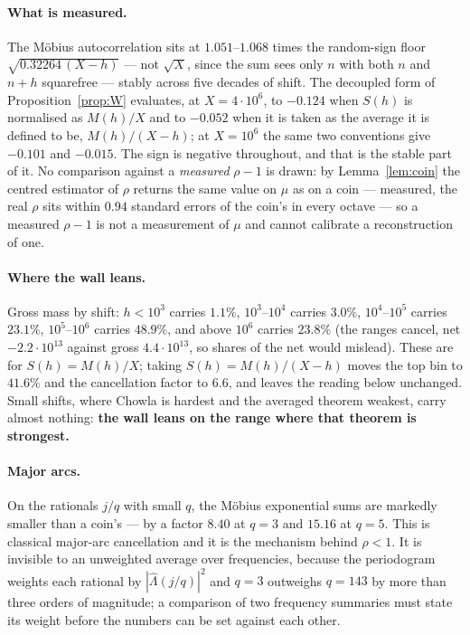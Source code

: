 \documentclass[11pt,a4paper]{article}
\theoremstyle{plain}
\theoremstyle{definition}
\begin{document}
\paragraph{What is measured.} The M\"obius autocorrelation sits at
$1.051$--$1.068$ times the random-sign floor $\sqrt{0.32264\,(X-h)}$
--- not $\sqrt X$, since the sum sees only $n$ with both $n$ and $n+h$
squarefree --- stably across five decades of shift. The decoupled form
of Proposition~\ref{prop:W} evaluates, at $X = 4\cdot10^6$, to
$-0.124$ when $S(h)$ is normalised as $M(h)/X$ and to $-0.052$ when it
is taken as the average it is defined to be, $M(h)/(X-h)$; at
$X = 10^6$ the same two conventions give $-0.101$ and $-0.015$. The
sign is negative throughout, and that is the stable part of it. No
comparison against a \emph{measured} $\rho-1$ is drawn: by
Lemma~\ref{lem:coin} the centred estimator of $\rho$ returns the same
value on $\mu$ as on a coin --- measured, the real $\rho$ sits within
$0.94$ standard errors of the coin's in every octave --- so a measured
$\rho-1$ is not a measurement of $\mu$ and cannot calibrate a
reconstruction of one.

\paragraph{Where the wall leans.} Gross mass by shift:
$h<10^3$ carries $1.1\%$, $10^3$--$10^4$ carries $3.0\%$,
$10^4$--$10^5$ carries $23.1\%$, $10^5$--$10^6$ carries $48.9\%$, and
above $10^6$ carries $23.8\%$ (the ranges cancel, net $-2.2\cdot10^{13}$
against gross $4.4\cdot10^{13}$, so shares of the net would mislead).
These are for $S(h)=M(h)/X$; taking $S(h)=M(h)/(X-h)$ moves the top bin
to $41.6\%$ and the cancellation factor to $6.6$, and leaves the
reading below unchanged.
Small shifts, where Chowla is hardest and the averaged theorem weakest,
carry almost nothing: \textbf{the wall leans on the range where that
theorem is strongest.}

\paragraph{Major arcs.} On the rationals $j/q$ with small $q$, the
M\"obius exponential sums are markedly smaller than a coin's ---
by a factor $8.40$ at $q=3$ and $15.16$ at $q=5$. This is classical
major-arc cancellation and it is the mechanism behind $\rho<1$. It is
invisible to an unweighted average over frequencies, because the
periodogram weights each rational by $|\hat\Lambda(j/q)|^2$ and $q=3$
outweighs $q=143$ by more than three orders of magnitude; a comparison
of two frequency summaries must state its weight before the numbers can
be set against each other.
\end{document}
